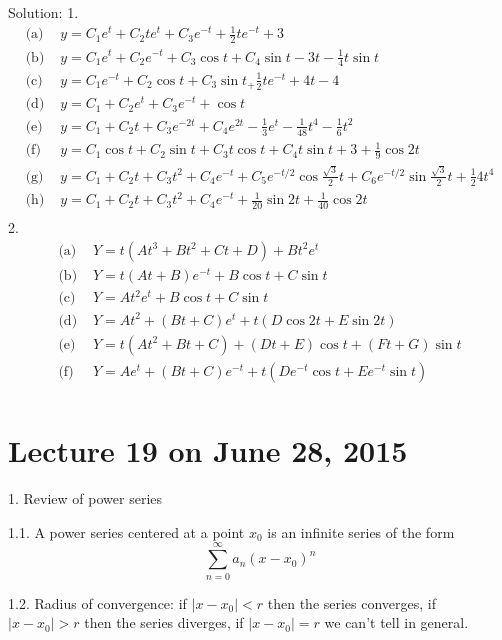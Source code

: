 \documentclass[11pt]{article}
\begin{document}
Solution: 
1. 
$$
\begin{aligned}
\text{(a)  }& y = C_1 e^t + C_2 te^t + C_3 e^{-t} + \frac 1 2 te^{-t}+ 3\\
\text{(b)  }& y = C_1 e^t + C_2 e^{-t} + C_3 \cos t + C_4 \sin t - 3t - \frac 1 4 t\sin t\\
\text{(c)  }& y = C_1 e^{-t} + C_2 \cos t + C_3 \sin t _+ \frac 1 2 te^{-t} + 4t - 4\\
\text{(d)  }& y = C_1 + C_2 e^t + C_3 e^{-t} + \cos t\\
\text{(e)  }& y = C_1 + C_2 t + C_3 e^{-2t} + C_4 e^{2t} - \frac 1 3 e^t - \frac 1 {48}t^4 - \frac 1 6 t^2\\
\text{(f)  }& y = C_1 \cos t + C_2 \sin t + C_3 t \cos t + C_4 t\sin t + 3 + \frac 1 9 \cos 2t\\
\text{(g)  }& y = C_1 + C_2 t + C_3 t^2 + C_4 e^{-t} + C_5 e^{-t/2}\cos \frac{\sqrt 3}2t + C_6 e^{-t/2} \sin \frac{\sqrt 3} 2 t + \frac 1 24 t^4 \\
\text{(h)  }& y = C_1 + C_2 t + C_3 t^2 + C_4 e^{-t} + \frac 1 {20}\sin 2t + \frac 1 {40}\cos 2t\\
\end{aligned}
$$
2. 
$$
\begin{aligned}
\text{(a)  }& Y = t(At^3 + Bt^2 + Ct + D) + Bt^2 e^t\\
\text{(b)  }& Y = t(At+B)e^{-t} + B\cos t + C\sin t\\
\text{(c)  }& Y = At^2 e^t + B\cos t + C\sin t\\
\text{(d)  }& Y = At^2 + (Bt+C) e^t + t(D\cos 2t + E\sin 2t)\\
\text{(e)  }& Y = t(At^2 + Bt+ C)+ (Dt+E)\cos t + (Ft+G) \sin t\\
\text{(f)  }& Y = Ae^t + (Bt+C)e^{-t} + t(De^{-t}\cos t + Ee^{-t}\sin t)\\
\end{aligned}
$$

\newpage
\section{Lecture 19 on June 28, 2015}

1. Review of power series

1.1. A power series centered at a point $x_0$ is an infinite series of the form
$$\sum_{n=0}^\infty a_n (x-x_0)^n$$

1.2. Radius of convergence: if $|x-x_0|<r$ then the series converges, if $|x-x_0|>r$ then the series diverges, if $|x-x_0|=r$ we can't tell in general. 
\end{document}
